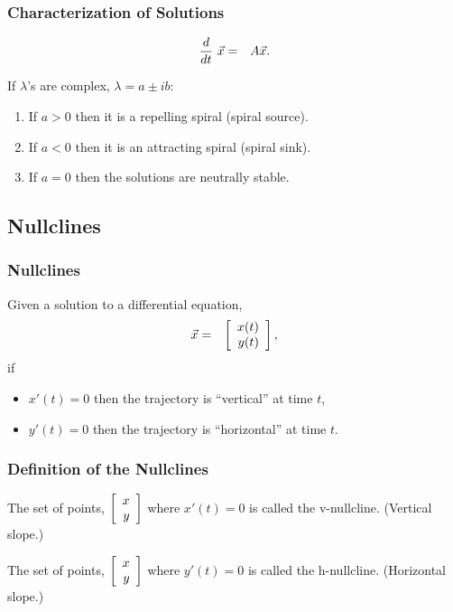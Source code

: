 \begin{frame}
  \frametitle{Characterization of Solutions}

  \begin{eqnarray*}
    \deriv{~}{t} \vec{x} & = & A \vec{x}.
  \end{eqnarray*}

  If $\lambda$'s are complex, $\lambda = a \pm ib$:
  \begin{enumerate}
  \item If $a>0$ then it is a repelling spiral (spiral source).
  \item If $a<0$ then it is an attracting spiral (spiral sink).
  \item If $a=0$ then the solutions are neutrally stable.
  \end{enumerate}

\end{frame}


\subsection{Nullclines}

\begin{frame}
  \frametitle{Nullclines}

  Given a solution to a differential equation,
  \begin{eqnarray*}
    \vec{x} & = & \vecTwo{x(t)}{y(t)},
  \end{eqnarray*}
  if
  \begin{itemize}
  \item $x'(t)=0$ then the trajectory is ``vertical'' at time $t$,
  \item $y'(t)=0$ then the trajectory is ``horizontal'' at time $t$.
  \end{itemize}

\end{frame}


\begin{frame}
  \frametitle{Definition of the Nullclines}

  The set of points, $\vecTwo{x}{y}$ where $x'(t)=0$ is called the v-nullcline. (Vertical slope.)

  The set of points, $\vecTwo{x}{y}$ where $y'(t)=0$ is called the h-nullcline. (Horizontal slope.)

\end{frame}


